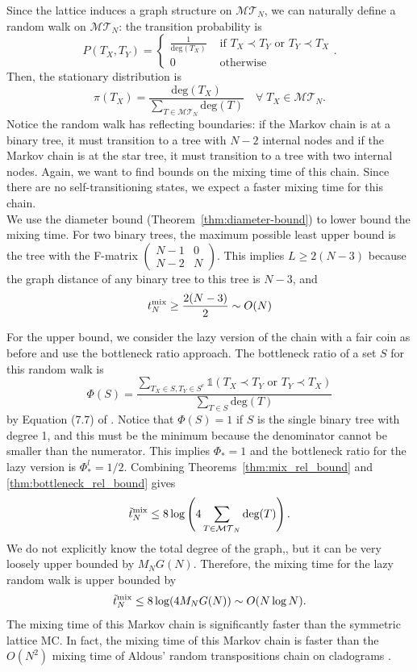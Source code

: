 \documentclass{article}
\begin{document}
Since the lattice induces a graph structure on $\mathcal{MT}_N$, we can naturally define a random walk on $\mathcal{MT}_N$: the transition probability is \[  P(T_X, T_Y) = \begin{cases} \frac{1}{\text{deg}(T_X)} & \text{ if } T_X \prec T_Y \text{ or } T_Y \prec T_X \\ 0 & \text{ otherwise} \end{cases}. \] Then, the stationary distribution is \[ \pi(T_X) =  \frac{\text{deg}(T_X)}{\sum_{T \in \mathcal{MT}_N} \text{deg}(T)} \quad \forall \; T_X \in \mathcal{MT}_N .\] 
Notice the random walk has reflecting boundaries: if the Markov chain is at a binary tree, it must transition to a tree with $N-2$ internal nodes and if the Markov chain is at the star tree, it must transition to a tree with two internal nodes. Again, we want to find bounds on the mixing time of this chain. Since there are no self-transitioning states, we expect a faster mixing time for this chain. \\ 

We use the diameter bound (Theorem~\ref{thm:diameter-bound}) to lower bound the mixing time. For two binary trees, the maximum possible least upper bound is the tree with the F-matrix $\begin{pmatrix}
    N-1 & 0 \\
    N-2 & N
\end{pmatrix}$. This implies $L \geq 2(N-3)$ because the graph distance of any binary tree to this tree is $N-3$, and
\begin{equation} \label{eq:rw_mixing_lb}
    t^{\textup{mix}}_N \geq \frac{2(N-3)}{2} \sim O(N)
\end{equation}

For the upper bound, we consider the lazy version of the chain with a fair coin as before and use the bottleneck ratio approach. The bottleneck ratio of a set $S$ for this random walk  is \[ \Phi(S) =  \frac{\sum_{T_{X}\in S, T_{Y} \in S^c} \mathds{1}(T_{X} \prec T_{Y} \text{ or }T_{Y}\prec T_{X})}{\sum_{T \in S} \text{deg}(T)}\] by Equation (7.7) of \cite{levin2017markov}. Notice that $\Phi(S)=1$ if $S$ is the single binary tree with degree 1, and this must be the minimum because the denominator cannot be smaller than the numerator. This implies $\Phi_*=1$ and the bottleneck ratio for the lazy version is $\Phi^l_*=1/2$. Combining Theorems~\ref{thm:mix_rel_bound} and \ref{thm:bottleneck_rel_bound} gives \[ \tilde{t}^{\textup{mix}}_N \leq 8 \log\left (4 \sum_{T \in \mathcal{MT}_N} \text{deg}(T) \right ). \]
We do not explicitly know the total degree of the graph,, but it can be very loosely upper bounded by $M_N G(N)$. Therefore, the mixing time for the lazy random walk is upper bounded by 
\begin{equation} \label{eq:rw_mixing_ub}
    \tilde{t}^{\textup{mix}}_N \leq 8 \log (4 M_N G(N)) \sim O(N\log N). 
\end{equation}
The mixing time of this Markov chain is significantly faster than the symmetric lattice MC. In fact, the mixing time of this Markov chain is faster than the $O(N^2)$ mixing time of Aldous' random transpositions chain on cladograms \citep{aldous2000mixing,schweinsberg2002n2}. 
\end{document}
